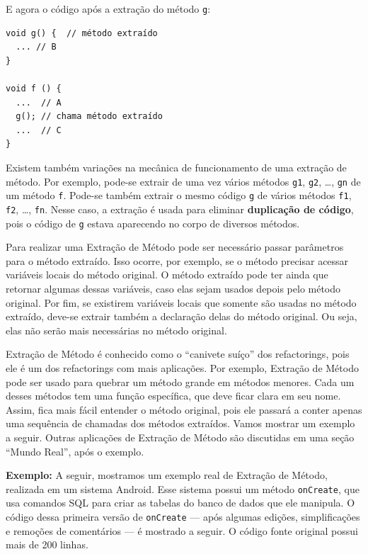 \documentclass[
  11pt,
  twoside]{book}
\newcommand{\passthrough}[1]{#1}
\begin{document}
E agora o código após a extração do método \passthrough{\lstinline!g!}:

\newpage

\begin{lstlisting}
void g() {  // método extraído
  ... // B
}

void f () {
  ...  // A
  g(); // chama método extraído
  ...  // C
}
\end{lstlisting}

 Existem também variações na mecânica de
funcionamento de uma extração de método. Por exemplo, pode-se extrair de
uma vez vários métodos \passthrough{\lstinline!g1!},
\passthrough{\lstinline!g2!}, \ldots, \passthrough{\lstinline!gn!} de um
método \passthrough{\lstinline!f!}. Pode-se também extrair o mesmo
código \passthrough{\lstinline!g!} de vários métodos
\passthrough{\lstinline!f1!}, \passthrough{\lstinline!f2!}, \ldots,
\passthrough{\lstinline!fn!}. Nesse caso, a extração é usada para
eliminar \textbf{duplicação de código}, pois o código de
\passthrough{\lstinline!g!} estava aparecendo no corpo de diversos
métodos.

Para realizar uma Extração de Método pode ser necessário passar
parâmetros para o método extraído. Isso ocorre, por exemplo, se o método
precisar acessar variáveis locais do método original. O método extraído
pode ter ainda que retornar algumas dessas variáveis, caso elas sejam
usados depois pelo método original. Por fim, se existirem variáveis
locais que somente são usadas no método extraído, deve-se extrair também
a declaração delas do método original. Ou seja, elas não serão mais
necessárias no método original.

Extração de Método é conhecido como o ``canivete suíço'' dos
refactorings, pois ele é um dos refactorings com mais aplicações. Por
exemplo, Extração de Método pode ser usado para quebrar um método grande
em métodos menores. Cada um desses métodos tem uma função específica,
que deve ficar clara em seu nome. Assim, fica mais fácil entender o
método original, pois ele passará a conter apenas uma sequência de
chamadas dos métodos extraídos. Vamos mostrar um exemplo a seguir.
Outras aplicações de Extração de Método são discutidas em uma seção
``Mundo Real'', após o exemplo.

\textbf{Exemplo:} A seguir, mostramos um exemplo real de Extração de
Método, realizada em um sistema Android. Esse sistema possui um método
\passthrough{\lstinline!onCreate!}, que usa comandos SQL para criar as
tabelas do banco de dados que ele manipula. O código dessa primeira
versão de \passthrough{\lstinline!onCreate!} --- após algumas edições,
simplificações e remoções de comentários --- é mostrado a seguir. O
código fonte original possui mais de 200 linhas.
\end{document}

